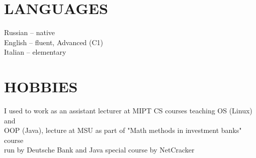 \documentclass[margin,12pt]{res}
\begin{document}
\begin{resume}
\section{LANGUAGES}
Russian -- native\\
English -- fluent, Advanced (C1)\\
Italian -- elementary

\section{HOBBIES}
I used to work as an assistant lecturer at MIPT CS courses teaching OS (Linux) and\\
 OOP (Java), lecture at MSU as part of "Math methods in investment banks" course\\
run by Deutsche Bank and Java special course by NetCracker

\end{resume}
\end{document}
